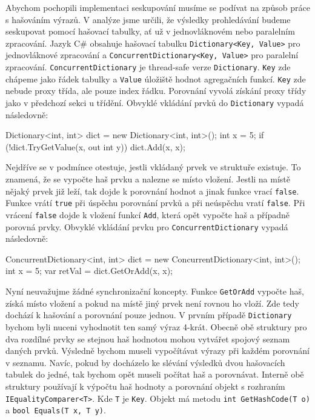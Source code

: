 Abychom pochopili implementaci seskupování musíme se podívat na způsob práce s hašováním výrazů.
V analýze jsme určili, že výsledky prohledávání budeme seskupovat pomocí hašovací tabulky, ať už v jednovláknovém nebo paralelním zpracování.
Jazyk C\# obsahuje hašovací tabulku \texttt{Dictionary<Key, Value>} pro jednovláknové zpracování a \texttt{ConcurrentDictionary<Key, Value>} pro paralelní zpracování.
\texttt{ConcurrentDictionary} je thread-safe verze \texttt{Dictionary}. 
\texttt{Key} zde chápeme jako řádek tabulky a \texttt{Value} úložiště hodnot agregačních funkcí. 
\texttt{Key} zde nebude proxy třída, ale pouze index řádku.
Porovnání vyvolá získání proxy třídy jako v předchozí sekci u třídění.
Obvyklé vkládání prvků do \texttt{Dictionary} vypadá následovně:
\begin{code}
Dictionary<int, int> dict = new Dictionary<int, int>();
int x = 5;
if (!dict.TryGetValue(x, out int y)) dict.Add(x, x);
\end{code}
Nejdříve se v podmínce otestuje, jestli vkládaný prvek ve struktuře existuje.
To znamená, že se vypočte haš prvku a nalezne se místo vložení.
Jestli na místě nějaký prvek již leží, tak dojde k porovnání hodnot a jinak funkce vrací \texttt{false}.
Funkce vrátí \texttt{true} při úspěchu porovnání prvků a při neúspěchu vratí \texttt{false}.
Při vrácení \texttt{false} dojde k vložení funkcí \texttt{Add}, která opět vypočte haš a případně porovná prvky.
Obvyklé vkládání prvku pro \texttt{ConcurrentDictionary} vypadá následovně:
\begin{code}
ConcurrentDictionary<int, int> dict = 
    new ConcurrentDictionary<int, int>();
int x = 5;
var retVal = dict.GetOrAdd(x, x);
\end{code}
Nyní neuvažujme žádné synchronizační koncepty.
Funkce \texttt{GetOrAdd} vypočte haš, získá místo vložení a pokud na místě jiný prvek není rovnou ho vloží.
Zde tedy dochází k hašování a porovnání pouze jednou.
V prvním případě \texttt{Dictionary} bychom byli nuceni vyhodnotit ten samý výraz 4-krát.
Obecně obě struktury pro dva rozdílné prvky se stejnou haš hodnotou mohou vytvářet spojový seznam daných prvků.
Výsledně bychom museli vypočítávat výrazy při každém porovnání v seznamu.
Navíc, pokud by docházelo ke slévání výsledků dvou hašovacích tabulek do jedné, tak bychom opět museli počítat haš a porovnávat.
Interně obě struktury používají k výpočtu haš hodnoty a porovnání objekt s rozhraním \texttt{IEqualityComparer<T>}.
Kde \texttt{T} je \texttt{Key}. 
Objekt má metodu \texttt{int GetHashCode(T o)} a \texttt{bool Equals(T x, T y)}.
